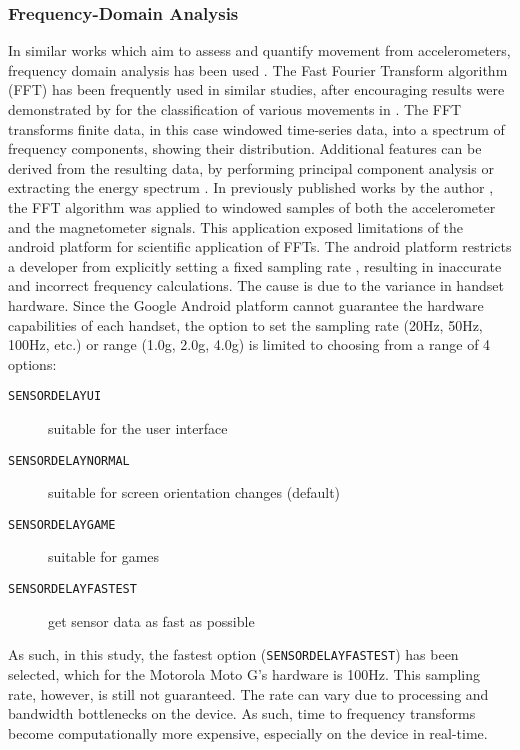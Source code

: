 \subsubsection{Frequency-Domain Analysis}
In similar works which aim to assess and quantify movement from accelerometers, frequency domain analysis has been used \cite{Preece2009}. The Fast Fourier Transform algorithm (FFT) \cite{Martens1992} has been frequently used in similar studies, after encouraging results were demonstrated by \citeauthor{Bao2004} for the classification of various movements in \citeyear{Bao2004} \cite{Bao2004}. The FFT transforms finite data, in this case windowed time-series data, into a spectrum of frequency components, showing their distribution. Additional features can be derived from the resulting data, by performing principal component analysis \cite{Preece2009} or extracting the energy spectrum \cite{Tapia2007}.
In previously published works by the author \cite{Hartin2014-WAGER}, the FFT algorithm was applied to windowed samples of both the accelerometer and the magnetometer signals. This application exposed limitations of the android platform for scientific application of FFTs. The android platform restricts a developer from explicitly setting a fixed sampling rate \cite{GoogleAndroid2016a}, resulting in inaccurate and incorrect frequency calculations. The cause is due to the variance in handset hardware. Since the Google Android platform cannot guarantee the hardware capabilities of each handset, the option to set the sampling rate (20Hz, 50Hz, 100Hz, etc.) or range (1.0g, 2.0g, 4.0g) is limited to choosing from a range of 4 options:

\begin{description}
	\item [\texttt{SENSOR\textunderscore DELAY\textunderscore UI}] suitable for the user interface
	\item [\texttt{SENSOR\textunderscore DELAY\textunderscore NORMAL}] suitable for screen orientation changes (default)
	\item [\texttt{SENSOR\textunderscore DELAY\textunderscore GAME}] suitable for games
	\item [\texttt{SENSOR\textunderscore DELAY\textunderscore FASTEST}] get sensor data as fast as possible
\end{description}

As such, in this study, the fastest option (\texttt{SENSOR\textunderscore DELAY\textunderscore FASTEST}) has been selected, which for the Motorola Moto G's hardware is 100Hz. This sampling rate, however, is still not guaranteed. The rate can vary due to processing and bandwidth bottlenecks on the device. As such, time to frequency transforms become computationally more expensive, especially on the device in real-time.

